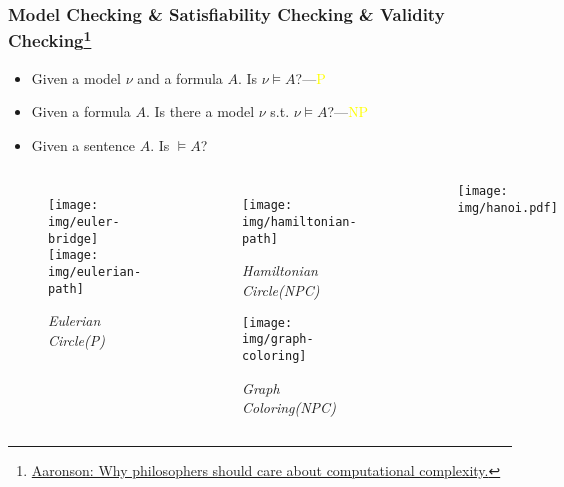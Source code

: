 \documentclass[UTF8,11pt,colorlinks,compress,openany]{beamer}%
\begin{document}
\begin{frame}\frametitle{\small Model Checking \& Satisfiability Checking \& Validity Checking\footnote{\tiny \href{https://www.scottaaronson.com/papers/philos.pdf}{Aaronson: Why philosophers should care about computational complexity.}}}
	\begin{itemize}
		\item Given a model $\nu$ and a formula $A$. Is $\nu\vDash A$?\hfill ---\textcolor{yellow}{P}
		\item Given a formula $A$. Is there a model $\nu$ s.t. $\nu\vDash A$?\hfill ---\textcolor{yellow}{NP}
		\item Given a sentence $A$. Is $\vDash A$?
	\end{itemize}
\begin{minipage}{\textwidth}
	\begin{columns}
			\begin{figure}
				\texttt{[image: img/euler-bridge]}\\
				\texttt{[image: img/eulerian-path]}\caption{\tiny{\textit{Eulerian Circle(P)}}}
			\end{figure}
		\vspace{-0.3cm}
			\begin{figure}
				\texttt{[image: img/hamiltonian-path]}\vspace{-0.2cm}\caption{\tiny{\textit{Hamiltonian Circle(NPC)}}}\vspace{-0.2cm}
				\texttt{[image: img/graph-coloring]}\vspace{-0.3cm}\caption{\tiny{\textit{Graph Coloring(NPC)}}}
			\end{figure}
		\vspace{-0.5cm}
			\begin{center}
				\begin{figure}
					\texttt{[image: img/hanoi.pdf]}
				\end{figure}
			\end{center}
	\end{columns}
\end{minipage}
\end{frame}
\end{document}
